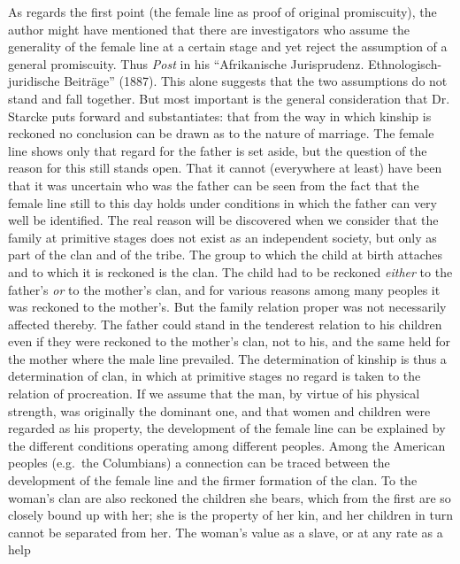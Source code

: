 \documentclass[12pt,a4paper,openany]{book}
\newcommand{\opage}[1]{\marginnote{\footnotesize\textit{[#1]}}}
\begin{document}
As regards the first point (the female line as proof of
original promiscuity), the author might have mentioned that there are
investigators who assume the generality of the female line at a certain
stage and yet reject the assumption of a general promiscuity.
Thus \emph{Post} in his ``Afrikanische Jurisprudenz. Ethnologisch-juridische
Beiträge'' (1887). This alone suggests that the two
assumptions do not stand and fall together. But most important is the
general consideration that Dr. Starcke puts forward and substantiates:
that from the way in which kinship is reckoned no
conclusion can be drawn as to the nature of marriage. The female line shows
only that regard for the father is set aside, but the question
of the reason for this still stands open. That it cannot (everywhere at
least) have been that it was uncertain who was
the father can be seen from the fact that the female line still to this day holds
under conditions in which the father can very well be identified. The real
reason will be discovered when we consider that the family at primitive
stages does not exist as an independent society, but only as part
of the clan and of the tribe. The group to which the child at
birth attaches and to which it is reckoned is the clan. The child had to be reckoned
\emph{either} to the father's \emph{or} to the mother's clan, and for various
reasons among many peoples it was reckoned to the mother's. But
the family relation proper was not necessarily affected thereby.
The father could stand in the tenderest relation to his children even if
they were reckoned to the mother's clan, not to his, and the same
held for the mother where the male line prevailed.
The determination of kinship is thus a determination of clan, in which
at primitive stages no regard is taken to the relation of procreation.
If we assume that the man, by virtue of his physical strength, was originally
the dominant one, and that women and children were regarded as
his property, the development of the female line can be explained by the
different conditions operating among different peoples. Among the
American peoples (e.g.\ the Columbians) a connection can be traced
between the development of the female line and the firmer
\opage{791}formation of the clan. To the woman's clan are also reckoned the children she bears,
which from the first are so closely bound up with her;
she is the property of her kin, and her children in turn cannot
be separated from her. The woman's value as a slave, or at any rate as a help
\end{document}
